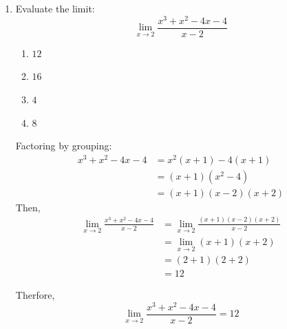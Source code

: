 \begin{enumerate}
\item Evaluate the limit: $$\displaystyle \lim_{x \to 2}\frac{x^3 + x^2 - 4x - 4}{x - 2}$$
\begin{enumerate}
    \item $12$
    \item $16$
    \item $4$
    \item $8$
\end{enumerate}
Factoring by grouping:
\begin{align*}
    x^3 + x^2 - 4x - 4 &= x^2 (x + 1) - 4 (x + 1) \\
    &= (x + 1)(x^2 - 4) \\
    &= (x + 1)(x - 2)(x + 2)
\end{align*}
Then,
\begin{align*}
    \lim_{x \to 2}{\frac{x^3 + x^2 - 4x - 4}{x - 2}} &= \lim_{x \to 2}{\frac{(x + 1)(x - 2)(x + 2)}{x - 2}} \\
    &= \lim_{x \to 2}(x + 1)(x + 2) \\
    &= (2 + 1)(2 + 2) \\
    &= 12
\end{align*}

Therfore,
\[
    \boxed{\lim_{x \to 2}{\frac{x^3 + x^2 - 4x - 4}{x - 2}} = 12}
\]
\end{enumerate}